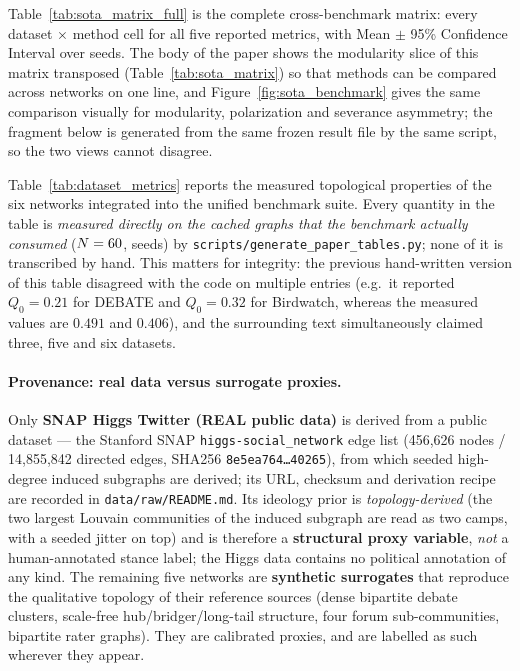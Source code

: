 Table~\ref{tab:sota_matrix_full} is the complete cross-benchmark matrix: every
dataset $\times$ method cell for all five reported metrics, with Mean $\pm$ 95\%
Confidence Interval over \BenchSeeds{} seeds. The body of the paper shows the
modularity slice of this matrix transposed (Table~\ref{tab:sota_matrix}) so that
methods can be compared across networks on one line, and Figure~\ref{fig:sota_benchmark}
gives the same comparison visually for modularity, polarization and severance
asymmetry; the fragment below is generated from the same frozen result file by
the same script, so the two views cannot disagree.

\begin{table}[t]
\centering
\footnotesize
\setlength{\tabcolsep}{3.5pt}
\caption{\textbf{Complete Performance Comparison Matrix of Opinion and Topology Dynamics Methods across Benchmark Networks.} Values report Mean $\pm$ 95\% Confidence Interval across \BenchSeeds{} independent random seeds ($N=\BenchNodes$, $T=\BenchRounds$ rounds). Generated from \texttt{results/sota\_benchmark.json} by \texttt{scripts/generate\_paper\_tables.py}.}
\label{tab:sota_matrix_full}

\end{table}

Table~\ref{tab:dataset_metrics} reports the measured topological properties of the six networks
integrated into the unified benchmark suite. Every quantity in the table is \emph{measured
directly on the cached graphs that the benchmark actually consumed}
($N=\BenchNodes$, \BenchSeeds{} seeds) by \texttt{scripts/generate\_paper\_tables.py}; none of it is
transcribed by hand. This matters for integrity: the previous hand-written version of this table
disagreed with the code on multiple entries (e.g.\ it reported $Q_0=0.21$ for DEBATE and
$Q_0=0.32$ for Birdwatch, whereas the measured values are $0.491$ and $0.406$), and the surrounding
text simultaneously claimed three, five and six datasets.

\paragraph{Provenance: real data versus surrogate proxies.}
Only \textbf{SNAP Higgs Twitter (REAL public data)} is derived from a public dataset --- the
Stanford SNAP \texttt{higgs-social\_network} edge list (456{,}626 nodes / 14{,}855{,}842 directed
edges, SHA256 \texttt{8e5ea764\ldots 40265}), from which seeded high-degree induced subgraphs are
derived; its URL, checksum and derivation recipe are recorded in \texttt{data/raw/README.md}. Its
ideology prior is \emph{topology-derived} (the two largest Louvain communities \citep{blondel2008fast} of the induced
subgraph are read as two camps, with a seeded jitter on top) and is therefore a \textbf{structural
proxy variable}, \emph{not} a human-annotated stance label; the Higgs data contains no political
annotation of any kind. The remaining five networks are \textbf{synthetic surrogates} that
reproduce the qualitative topology of their reference sources (dense bipartite debate clusters,
scale-free hub/bridger/long-tail structure, four forum sub-communities, bipartite rater graphs).
They are calibrated proxies, and are labelled as such wherever they appear.

